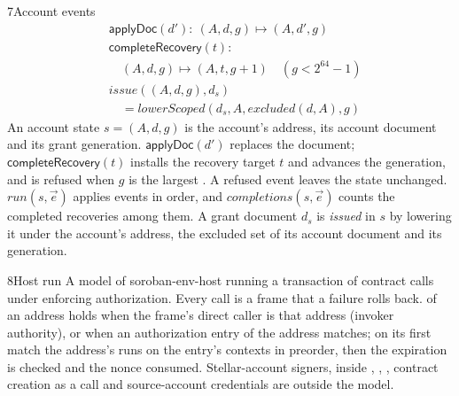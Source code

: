 \begin{perchdefinition}{7}{Account events}\label{def:account-events}
\[\begin{aligned}&\mathsf{applyDoc}(d'):\ (A, d, g) \mapsto (A, d', g)\\
&\mathsf{completeRecovery}(t):\\
&\quad (A, d, g) \mapsto (A, t, g + 1) \quad (g < 2^{64} - 1)\\
&\mathit{issue}((A, d, g), d_s)\\
&\quad = \mathit{lowerScoped}(d_s, A, \mathit{excluded}(d, A), g)\end{aligned}\]
An account state \(s = (A, d, g)\) is the account's address, its account document and its grant generation. \(\mathsf{applyDoc}(d')\) replaces the document; \(\mathsf{completeRecovery}(t)\) installs the recovery target \(t\) and advances the generation, and is refused when \(g\) is the largest . A refused event leaves the state unchanged. \(\mathit{run}(s, \vec e)\) applies events in order, and \(\mathit{completions}(s, \vec e)\) counts the completed recoveries among them. A grant document \(d_s\) is \emph{issued} in \(s\) by lowering it under the account's address, the excluded set of its account document and its generation.
\end{perchdefinition}
\begin{perchdefinition}{8}{Host run}\label{def:host-run}
A model of soroban-env-host running a transaction of contract calls under enforcing authorization. Every call is a frame that a failure rolls back.  of an address holds when the frame's direct caller is that address (invoker authority), or when an authorization entry of the address matches; on its first match the address's  runs on the entry's contexts in preorder, then the expiration is checked and the nonce consumed. Stellar-account signers,  inside , , , contract creation as a call and source-account credentials are outside the model.
\end{perchdefinition}

